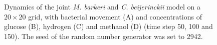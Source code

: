 \begin{figure}[h!]
{\begin{minipage}[t]{0.3\textwidth}
  \end{minipage}
  }
  \caption{Dynamics of the joint \emph{M. barkeri} and \emph{C. beijerinckii} model on a $20\times20$ grid, with bacterial movement (A) and concentrations of glucose (B), hydrogen (C) and methanol (D) (time step 50, 100 and 150). The seed of the random number generator was set to 2942.}
  \label{fig:cbgrid}
\end{figure}

